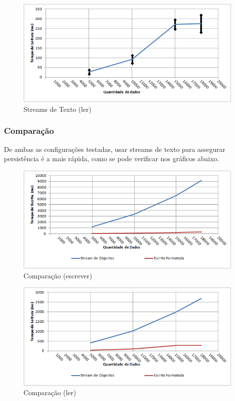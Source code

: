 \documentclass[a5paper,twocolumn, 11pt]{article}
\begin{document}
\begin{figure}[h!b!t!]
    \caption[Streams de Texto (ler)]{Streams de Texto (ler)}
    \centering
        \includegraphics[width=400pt]{ef_2.png}
\end{figure}

\newpage
\twocolumn
\subsubsection{Comparação}
De ambas as configurações testadas, usar streams de texto para assegurar persistência é a mais rápida, como se pode verificar nos gráficos abaixo.
\clearpage
\onecolumn
\begin{figure}[h!b!t!]
    \caption[Comparação (escrever)]{Comparação (escrever)}
    \centering
        \includegraphics[width=400pt]{cmp_1.png}
\end{figure}
\begin{figure}[h!b!t!]
    \caption[Comparação (ler)]{Comparação (ler)}
    \centering
        \includegraphics[width=400pt]{cmp_2.png}
\end{figure}
\end{document}
